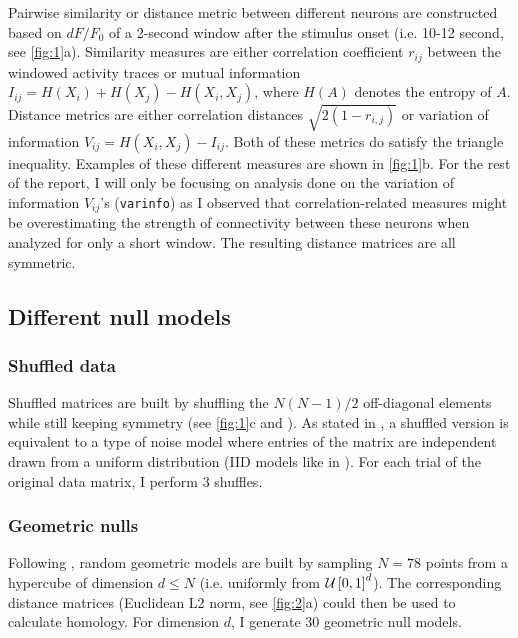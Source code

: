 Pairwise similarity or distance metric between different neurons are constructed based on $dF/F_0$ of a 2-second window after the stimulus onset (i.e. 10-12 second, see \autoref{fig:1}a). Similarity measures are either correlation coefficient $r_{ij}$ between the windowed activity traces or mutual information $I_{ij} = H(X_i) + H(X_j) - H(X_i,X_j)$, where $H(A)$ denotes the entropy of $A$. Distance metrics are either correlation distances $\sqrt{2(1-r_{i,j})}$ or variation of information $V_{ij} = H(X_i,X_j) - I_{ij}$. Both of these metrics do satisfy the triangle inequality. Examples of these different measures are shown in \autoref{fig:1}b. For the rest of the report, I will only be focusing on analysis done on the variation of information $V_{ij}$'s (\texttt{varinfo}) as I observed that correlation-related measures might be overestimating the strength of connectivity between these neurons when analyzed for only a short window. The resulting distance matrices are all symmetric.



\subsection{Different null models}

\subsubsection*{Shuffled data}

Shuffled matrices are built by shuffling the $N(N-1)/2$ off-diagonal elements while still keeping symmetry (see \autoref{fig:1}c and \cite{Giusti2015-uo}). As stated in \cite{Giusti2015-uo}, a shuffled version is equivalent to a type of noise model where entries of the matrix are independent drawn from a uniform distribution (IID models like in \cite{Giusti2015-uo,Blevins2021-tf}). For each trial of the original data matrix, I perform 3 shuffles.

\subsubsection*{Geometric nulls}

Following \cite{Giusti2015-uo}, random geometric models are built by sampling $N=78$ points from a hypercube of dimension $d \le N$ (i.e. uniformly from $\mathcal{U}\left[0,1\right]^d$). The corresponding distance matrices (Euclidean L2 norm, see \autoref{fig:2}a) could then be used to calculate homology. For dimension $d$, I generate 30 geometric null models.

